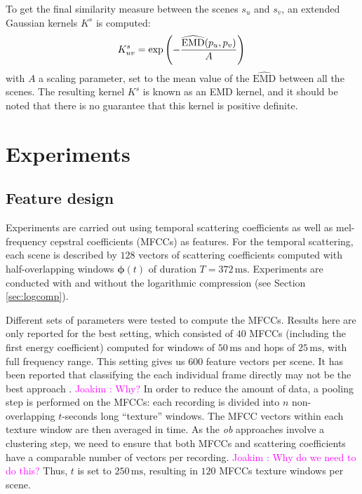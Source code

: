 \documentclass[journal]{IEEEtran}
\newcommand*{\EMD}{\mathrm{EMD}}
\newcommand{\ja}[1]{\textcolor{magenta}{Joakim : #1}}
\begin{document}
To get the final similarity measure between the scenes $s_u$ and $s_v$, an extended Gaussian kernels $K^s$ \cite{chapelle1999support,jing2003support} is computed:
\begin{equation}
\label{eq:ks}
K_{uv}^s = \exp\left( - \dfrac{\widehat{\EMD}(p_u,p_v)}{A} \right) \\
\end{equation}
with $A$ a scaling parameter, set to the mean value of the $\widehat{\EMD}$ between all the scenes. The resulting kernel $K^s$ is known as an EMD kernel, and it should be noted that there is no guarantee that this kernel is positive definite.

\section{Experiments}
\label{sec:experiments}

\subsection{Feature design}

Experiments are carried out using temporal scattering coefficients as well as mel-frequency cepstral coefficients (MFCCs) as features. For the temporal scattering, each scene is described by $128$ vectors of scattering coefficients computed with half-overlapping windows $\boldsymbol{\phi}(t)$ of duration $T=372\,\mathrm{ms}$. Experiments are conducted with and without the logarithmic compression (see Section \ref{sec:logcomp}).

Different sets of parameters were tested to compute the MFCCs. Results here are only reported for the best setting, which consisted of $40$ MFCCs (including the first energy coefficient) computed for windows of $50\,\mathrm{ms}$ and hops of $25\,\mathrm{ms}$, with full frequency range. This setting gives us $600$ feature vectors per scene. It has been reported that classifying the each individual frame directly may not be the best approach \cite{rakotomamonjy2015histogram}. \ja{Why?} In order to reduce the amount of data, a pooling step is performed on the MFCCs: each recording is divided into $n$ non-overlapping $t$-seconds long ``texture'' windows. The MFCC vectors within each texture window are then averaged in time. As the \emph{ob} approaches involve a clustering step, we need to ensure that both MFCCs and scattering coefficients have a comparable number of vectors per recording. \ja{Why do we need to do this?} Thus, $t$ is set to $250\,\mathrm{ms}$, resulting in $120$ MFCCs texture windows per scene.
\end{document}
